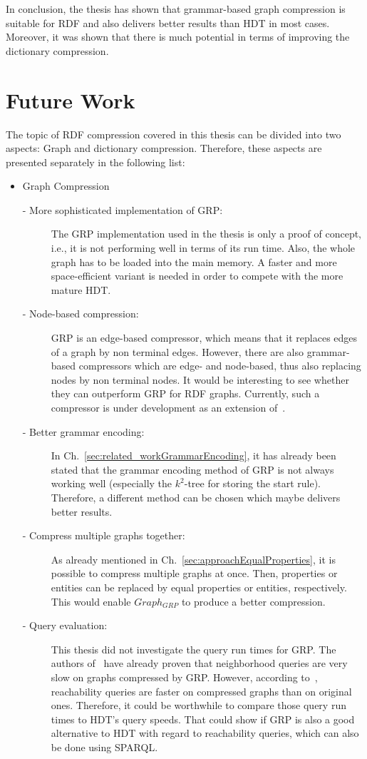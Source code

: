 In conclusion, the thesis has shown that grammar-based graph compression is suitable for RDF and also delivers better results than HDT in most cases. Moreover, it was shown that there is much potential in terms of improving the dictionary compression.

\section{Future Work}\label{sec:futurework}

The topic of RDF compression covered in this thesis can be divided into two aspects: Graph and dictionary compression. Therefore, these aspects are presented separately in the following list:

\begin{itemize}
	\item Graph Compression
	\begin{description}
		\item [- More sophisticated implementation of GRP:] The GRP implementation used in the thesis is only a proof of concept, i.e., it is not performing well in terms of its run time. Also, the whole graph has to be loaded into the main memory. A faster and more space-efficient variant is needed in order to compete with the more mature HDT.
		\item [- Node-based compression:] GRP is an edge-based compressor, which means that it replaces edges of a graph by non terminal edges. However, there are also grammar-based compressors which are edge- and node-based, thus also replacing nodes by non terminal nodes. It would be interesting to see whether they can outperform GRP for RDF graphs. Currently, such a compressor is under development as an extension of~\cite{mattdk}.
		\item [- Better grammar encoding:] In Ch.~\ref{sec:related_workGrammarEncoding}, it has already been stated that the grammar encoding method of GRP is not always working well (especially the $k^2$-tree for storing the start rule). Therefore, a different method can be chosen which maybe delivers better results.
		\item [- Compress multiple graphs together:] As already mentioned in Ch.~\ref{sec:approachEqualProperties}, it is possible to compress multiple graphs at once. Then, properties or entities can be replaced by equal properties or entities, respectively. This would enable $Graph_{GRP}$ to produce a better compression.
		\item [- Query evaluation:] This thesis did not investigate the query run times for GRP. The authors of~\cite{maneth} have already proven that neighborhood queries are very slow on graphs compressed by GRP. However, according to~\cite{maneth}, reachability queries are faster on compressed graphs than on original ones. Therefore, it could be worthwhile to compare those query run times to HDT's query speeds. That could show if GRP is also a good alternative to HDT with regard to reachability queries, which can also be done using SPARQL.

\end{description}
\end{itemize}
